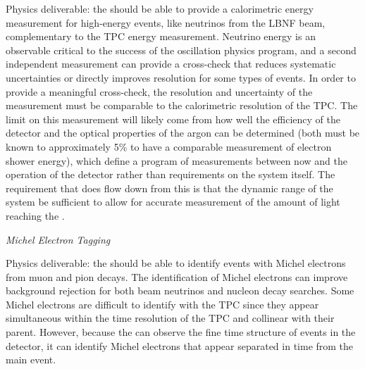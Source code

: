 Physics deliverable: the  should be able to provide a calorimetric energy measurement for high-energy events, like neutrinos from the LBNF beam, complementary to the TPC energy measurement.
Neutrino energy is an observable critical to the success of the oscillation physics program, and a second independent measurement can provide a cross-check that reduces systematic uncertainties or directly improves resolution for some types of events. In order to provide a meaningful cross-check, the resolution and uncertainty of the  measurement must be comparable to the calorimetric resolution of the TPC. The limit on this measurement will likely come from how well the efficiency of the detector and the optical properties of the argon can be determined (both must be known to approximately 5\% to have a comparable measurement of electron shower energy), which define a program of measurements between now and the operation of the detector rather than requirements on the system itself. The requirement that does flow down from this is that the dynamic range of the system be sufficient to allow for accurate measurement of the amount of light reaching the . 



\textit{\it Michel Electron Tagging}

Physics deliverable: the  should be able to identify events with Michel electrons from muon and pion decays.
The identification of Michel electrons can improve background rejection for both beam neutrinos and nucleon decay searches. 
Some Michel electrons are difficult to identify with the TPC since they appear simultaneous within the time resolution of the TPC and collinear with their parent. However, because the  can observe the fine time structure of events in the detector, it can identify Michel electrons that appear separated in time from the main event.
